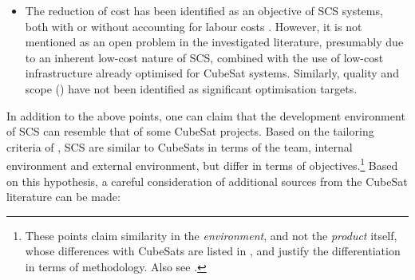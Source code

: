 \documentclass[a4paper,nobib,justified,final]{tufte-book}
\begin{document}
\begin{itemize}[itemsep=-1ex]
	\item The reduction of cost has been identified as an objective of \acs{SCS} systems, both with or without accounting for labour costs \autocite{sperettaCubeSatsPocketQubesOpportunities2016,heinAttoSatsChipSatsOther2019}. However, it is not mentioned as an open problem in the investigated literature, presumably due to an inherent low-cost nature of \acs{SCS}, combined with the use of low-cost infrastructure already optimised for CubeSat systems. Similarly, quality and scope () have not been identified as significant optimisation targets.
\end{itemize}

In addition to the above points, one can claim that the development environment of \acs{SCS} can resemble that of some CubeSat projects. Based on the tailoring criteria of \citeauthor{kalusCriteriaSoftwareProcess2013} \autocite{kalusCriteriaSoftwareProcess2013}, \acs{SCS} are similar to CubeSats in terms of the team, internal environment and external environment, but differ in terms of objectives.\footnote{These points claim similarity in the \emph{environment}, and not the \emph{product} itself, whose differences with CubeSats are listed in , and justify the differentiation in terms of methodology. Also see .} Based on this hypothesis, a careful consideration of additional sources from the CubeSat literature can be made:
\end{document}
